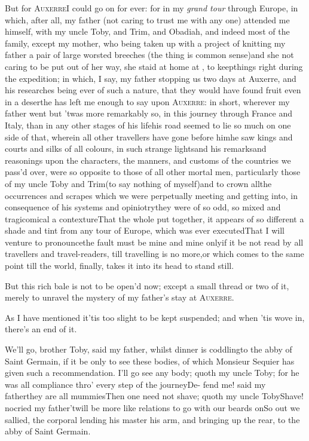 \documentclass{article}
\begin{document}
But for \textsc{Auxerre}\tsk I could go on for ever: for
in my \textit{grand tour} through Europe, in which, after all,
my father (not caring to trust me with any one) attended me
himself, with my uncle Toby, and Trim, and
Obadiah, and indeed most of the family, except my mother,
who being
taken up with a project of knitting my father a pair of large worsted breeches\tsk
(the thing is common sense)\tsk and she not caring to be put out of her way, she
staid at home at , to keep\break things right during the expedition;
in which, I say, my father stopping us two days at Auxerre, and his researches being
ever of such a nature, that they would have found fruit even in a desert\tsh he has
left me enough to say upon \textsc{Auxerre}: in short, wherever my father went\tsh
but ’twas more remarkably so, in this journey through France and Italy, than in any
other stages of his life\tsk his road seemed to lie so much on one side of that,
wherein all other travellers have gone before him\tsk he saw kings and courts and
silks of all colours,
in such strange lights\tsh and his remarks\break and reasonings upon the characters, the
manners, and customs of the countries we pass’d over, were so opposite to those of
all other mortal men, particularly those of my uncle Toby and Trim\tsk (to say
nothing of myself)\tsk and to crown all\tsk the occurrences and scrapes which we
were perpetually meeting and getting into, in consequence of his systems and
opiniotry\tsk they were of so odd, so mix\-ed and tragicomical a contexture\tsk That
the whole put together, it appears of so different a shade and tint from any tour of
Europe, which was ever executed\tsk That I will venture to pronounce\tsk the fault
must be mine and mine only\tsk if it be not read by all travellers and
travel-readers, till travelling is no more,\tsk or which comes to the same point\tsk
till the
world, finally, takes it into its head to stand still.\tsh

\tsh But this rich bale is not to be open’d now;
except a small thread or two of it, merely to unravel the mystery
of my father’s stay at \textsc{Auxerre}.

\tsh As I have mentioned it\tsk ’tis too slight
to be kept suspended; and when ’tis wove in, there’s an end
of it.

We’ll go, brother Toby, said my father, whilst dinner is coddling\tsk to the\break
abby of Saint Germain, if it be only to see these bodies, of which Monsieur Se\-quier has
given such a recommendation.\break
\tsh I’ll go see any body; quoth my uncle Toby; for he
was all compliance thro’ every step of the journey\tsh De-
fend me! said my father\tsk they are all mummies\tsk Then one need not shave; quoth
my uncle Toby\tsk Shave!  no\tsk\break cried my father\tsk ’twill be more like relations
to go with our beards on\tsk So out we sallied, the corporal lending his master his
arm, and bringing up the rear, to the abby of Saint Germain.
\end{document}
